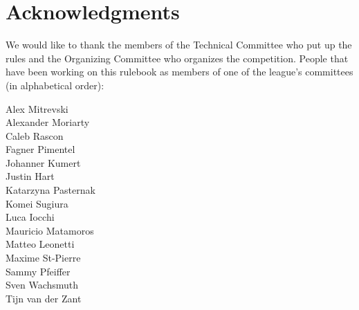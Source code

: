 \section*{Acknowledgments}
\label{sec:acknowledgments}
We would like to thank the members of the Technical Committee who put up the rules and the Organizing Committee who organizes the competition.
People that have been working on this rulebook as members of one of the league's committees (in alphabetical order):
\begin{center}
    \begin{minipage}{0.8\textwidth}
        \begin{multicols}{3}%
            \footnotesize
            \noindent%

            Alex Mitrevski\\
            Alexander Moriarty\\
            Caleb Rascon\\
            Fagner Pimentel\\
            \columnbreak
            Johanner Kumert\\
            Justin Hart\\
            Katarzyna Pasternak\\
            Komei Sugiura\\
            Luca Iocchi\\
            \columnbreak
            Mauricio Matamoros\\
            Matteo Leonetti\\
            Maxime St-Pierre \\
            Sammy Pfeiffer\\
            Sven Wachsmuth\\
            Tijn van der Zant\\
        \end{multicols}
    \end{minipage}
\end{center}

